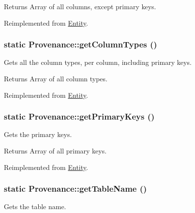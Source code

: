 \begin{DoxyReturn}{Returns}
Array of all columns, except primary keys. 
\end{DoxyReturn}


Reimplemented from \hyperlink{classEntity_a394717a08ffd54ec9a14d06727c86719}{Entity}.

\hypertarget{classProvenance_a3d14641b8cfcb3dbf226e82d684ab275}{
\subsubsection[{getColumnTypes}]{\setlength{\rightskip}{0pt plus 5cm}static Provenance::getColumnTypes ()}}
\label{classProvenance_a3d14641b8cfcb3dbf226e82d684ab275}
Gets all the column types, per column, including primary keys.

\begin{DoxyReturn}{Returns}
Array of all column types. 
\end{DoxyReturn}


Reimplemented from \hyperlink{classEntity_ad69437219c10955803707fbf6ac458e7}{Entity}.

\hypertarget{classProvenance_ad45c3e72c9462e73123e310a49da9154}{
\subsubsection[{getPrimaryKeys}]{\setlength{\rightskip}{0pt plus 5cm}static Provenance::getPrimaryKeys ()}}
\label{classProvenance_ad45c3e72c9462e73123e310a49da9154}
Gets the primary keys.

\begin{DoxyReturn}{Returns}
Array of all primary keys. 
\end{DoxyReturn}


Reimplemented from \hyperlink{classEntity_a61bbfbb4058427174e002a09ddc77c41}{Entity}.

\hypertarget{classProvenance_ae8dd5db6f4bdc8c131f625b7e1287827}{
\subsubsection[{getTableName}]{\setlength{\rightskip}{0pt plus 5cm}static Provenance::getTableName ()}}
\label{classProvenance_ae8dd5db6f4bdc8c131f625b7e1287827}
Gets the table name.

